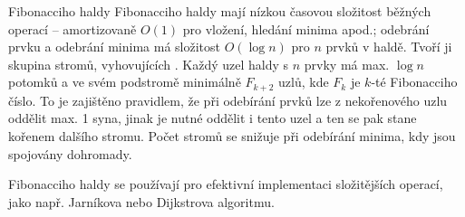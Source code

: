 \begin{obecne}{Fibonacciho haldy}
Fibonacciho haldy mají nízkou časovou složitost běžných operací -- amortizovaně $O(1)$ pro vložení, hledání minima apod.; odebrání prvku a odebrání minima má složitost $O(\log n)$ pro $n$ prvků v haldě. Tvoří ji skupina stromů, vyhovujících . Každý uzel haldy s $n$ prvky má max. $\log n$ potomků a ve svém podstromě minimálně $F_{k+2}$ uzlů, kde $F_k$ je $k$-té Fibonacciho číslo. To je zajištěno pravidlem, že při odebírání prvků lze z nekořenového uzlu oddělit max. 1 syna, jinak je nutné oddělit i tento uzel a ten se pak stane kořenem dalšího stromu. Počet stromů se snižuje při odebírání minima, kdy jsou spojovány dohromady.

Fibonacciho haldy se používají pro efektivní implementaci složitějších operací, jako např. Jarníkova nebo Dijkstrova algoritmu.
\end{obecne}
